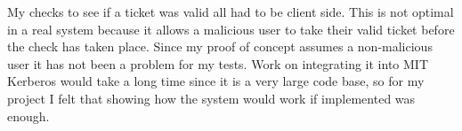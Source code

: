 \documentclass[]{report}   %
\begin{document}
My checks to see if a ticket was valid all had to be client side. This is not optimal in a real system because it allows a malicious user to take their valid ticket before the check has taken place. Since my proof of concept assumes a non-malicious user it has not been a problem for my tests. Work on integrating it into MIT Kerberos would take a long time since it is a very large code base, so for my project I felt that showing how the system would work if implemented was enough.




\end{document}
